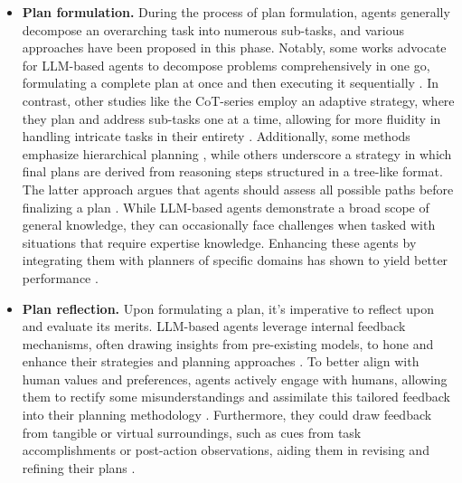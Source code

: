 \begin{itemize}[leftmargin=*]
    \item \textbf{Plan formulation.} During the process of plan formulation, agents generally decompose an overarching task into numerous sub-tasks, and various approaches have been proposed in this phase. Notably, some works advocate for LLM-based agents to decompose problems comprehensively in one go, formulating a complete plan at once and then executing it sequentially \cite{DBLP:conf/iclr/ZhouSHWS0SCBLC23,DBLP:conf/corl/IchterBCFHHHIIJ22,DBLP:journals/corr/abs-2305-18323,DBLP:journals/corr/abs-2211-09935}. In contrast, other studies like the CoT-series employ an adaptive strategy, where they plan and address sub-tasks one at a time, allowing for more fluidity in handling intricate tasks in their entirety \cite{DBLP:conf/nips/Wei0SBIXCLZ22,DBLP:conf/nips/KojimaGRMI22,DBLP:journals/corr/abs-2301-13379}. Additionally, some methods emphasize hierarchical planning \cite{DBLP:journals/corr/abs-2305-02412,DBLP:journals/corr/abs-2305-17390}, while others underscore a strategy in which final plans are derived from reasoning steps structured in a tree-like format. The latter approach argues that agents should assess all possible paths before finalizing a plan \cite{DBLP:conf/iclr/0002WSLCNCZ23,DBLP:journals/corr/abs-2305-10601,DBLP:journals/corr/abs-2305-14992,DBLP:conf/icml/HuangAPM22,DBLP:journals/corr/abs-2305-14992}. While LLM-based agents demonstrate a broad scope of general knowledge, they can occasionally face challenges when tasked with situations that require expertise knowledge. Enhancing these agents by integrating them with planners of specific domains has shown to yield better performance \cite{DBLP:journals/corr/abs-2304-11477,DBLP:journals/corr/abs-2307-02485,DBLP:journals/corr/abs-2205-00445,DBLP:journals/corr/abs-2308-06391}.

    \item \textbf{Plan reflection.} Upon formulating a plan, it's imperative to reflect upon and evaluate its merits. LLM-based agents leverage internal feedback mechanisms, often drawing insights from pre-existing models, to hone and enhance their strategies and planning approaches \cite{DBLP:journals/corr/abs-2303-11366,DBLP:journals/corr/abs-2303-17651,DBLP:journals/corr/abs-2305-14323,DBLP:journals/corr/abs-2308-00436}. To better align with human values and preferences, agents actively engage with humans, allowing them to rectify some misunderstandings and assimilate this tailored feedback into their planning methodology \cite{DBLP:journals/corr/abs-2303-17760,DBLP:conf/chi/WuTC22,DBLP:journals/corr/abs-2305-16291}. Furthermore, they could draw feedback from tangible or virtual surroundings, such as cues from task accomplishments or post-action observations, aiding them in revising and refining their plans \cite{DBLP:conf/iclr/YaoZYDSN023,DBLP:journals/corr/abs-2212-04088,DBLP:conf/corl/HuangXXCLFZTMCS22,DBLP:journals/corr/abs-2303-08268,DBLP:journals/corr/abs-2307-06135}.
\end{itemize}


